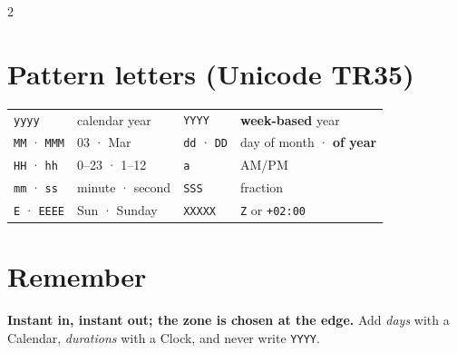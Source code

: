 \documentclass[8pt]{extarticle}
\begin{document}
\begin{multicols}{2}
\section{Pattern letters (Unicode TR35)}
{\footnotesize
\begin{tabular}{@{}l l l l@{}}
\toprule
\texttt{yyyy} & calendar year & \texttt{YYYY} & \textbf{week-based} year \\
\texttt{MM} · \texttt{MMM} & 03 · Mar & \texttt{dd} · \texttt{DD} & day of month · \textbf{of year} \\
\texttt{HH} · \texttt{hh} & 0–23 · 1–12 & \texttt{a} & AM/PM \\
\texttt{mm} · \texttt{ss} & minute · second & \texttt{SSS} & fraction \\
\texttt{E} · \texttt{EEEE} & Sun · Sunday & \texttt{XXXXX} & \texttt{Z} or \texttt{+02:00} \\
\bottomrule
\end{tabular}}

\section{Remember}
\textbf{Instant in, instant out; the zone is chosen at the edge.} Add \emph{days} with a
Calendar, \emph{durations} with a Clock, and never write \texttt{YYYY}.


\end{multicols}

\end{document}
